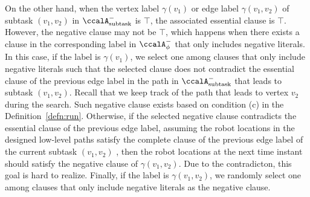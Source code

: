\documentclass[Afour,sageh,times]{sagej}
\newcommand{\auto}[1]{\ccalA_{\text{#1}}}
\newcommand{\autop}{\ccalA_{\phi}}
\begin{document}
{   On the other hand, when the vertex label $\gamma(v_1)$ or edge label $\gamma(v_1, v_2)$ of subtask $(v_1, v_2)$ in $\auto{subtask}^-$ is $\top$, the associated essential clause is $\top$. However, the negative clause may not be $\top$, which happens when there exists a  clause in the corresponding label in $\autop^-$ that only includes negative literals. In this case, if the label is $\gamma(v_1)$, we select one  among clauses that only include negative literals such that the selected clause does not contradict the essential clause of the previous edge label in the path in $\auto{subtask}^-$ that leads to subtask $(v_1, v_2)$. Recall that we keep track of the path that leads to vertex $v_2$ during the search.   Such negative clause exists based on condition (c) in the Definition~\ref{defn:run}.
   Otherwise, if the selected negative clause contradicts the essential clause of the previous edge label, assuming the robot locations in the designed low-level paths  satisfy the complete clause of the previous edge label of the current subtask $(v_1, v_2)$ , then the robot locations at the next time instant  should satisfy the negative clause of $\gamma(v_1, v_2)$. Due to the contradicton, this goal is hard to realize.  Finally, if the label is $\gamma(v_1, v_2)$, we randomly select  one among clauses that only include negative literals  as the negative clause.}



\end{document}
